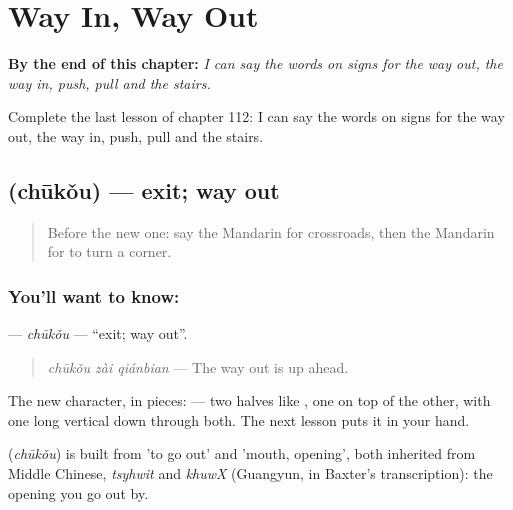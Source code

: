 
\chapter{Way In, Way Out}
\label{ch:zh-way-in-way-out}

\begin{chapteropening}
\textbf{By the end of this chapter:} \emph{I can say the words on signs for the way out, the way in, push, pull and the stairs.}

Complete the last lesson of chapter 112: I can say the words on signs for the way out, the way in, push, pull and the stairs.
\end{chapteropening}

\section[\texorpdfstring{\zh{出口} (chūkǒu)}{出口 (chūkǒu)}]{ (chūkǒu) — exit; way out}

\label{lesson:ZH-C112-chukou}



\begin{quote}
Before the new one: say the Mandarin for crossroads, then the Mandarin for to turn a corner.
\end{quote}

\subsection*{You'll want to know: }
\textbf{} — \emph{chūkǒu} — \textquotedblleft{}exit; way out\textquotedblright{}.

\begin{quote}
\textbf{} \emph{chūkǒu zài qiánbian} — The way out is up ahead.
\end{quote}

The new character, in pieces:  — two halves like , one on top of the other, with one long vertical down through both. The next lesson puts it in your hand.

\begin{cousinweb}
\textbf{} (\emph{chūkǒu}) is built from  'to go out' and  'mouth, opening', both inherited from Middle Chinese, \emph{tsyhwit} and \emph{khuwX} (Guangyun, in Baxter's transcription): the opening you go out by.
\end{cousinweb}

